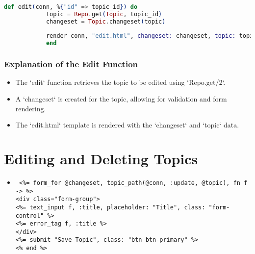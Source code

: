 \documentclass[aspectratio=169, table]{beamer}
\begin{document}
	\begin{frame}[fragile]
		\frametitle{}
		\begin{lstlisting}[language=Elixir]
			def edit(conn, %{"id" => topic_id}) do
			topic = Repo.get(Topic, topic_id)
			changeset = Topic.changeset(topic)
			
			render conn, "edit.html", changeset: changeset, topic: topic
			end
		\end{lstlisting}
	\end{frame}
	
	\begin{frame}
		\frametitle{Explanation of the Edit Function}
		\begin{itemize}
			\item The `edit` function retrieves the topic to be edited using `Repo.get/2`.
			\item A `changeset` is created for the topic, allowing for validation and form rendering.
			\item The `edit.html` template is rendered with the `changeset` and `topic` data.
		\end{itemize}
	\end{frame}
	
	\section{Editing and Deleting Topics}
	
	\begin{frame}{}
		\begin{itemize}
			\item \texttt{
				<\%= form\_for @changeset, topic\_path(@conn, :update, @topic), fn f -> \%> \\
				<div class="form-group"> \\
				<\%= text\_input f, :title, placeholder: "Title", class: "form-control" \%> \\
				<\%= error\_tag f, :title \%> \\
				</div> \\
				<\%= submit "Save Topic", class: "btn btn-primary" \%> \\
				<\% end \%>
			}
		\end{itemize}
	\end{frame}
	
\end{document}

